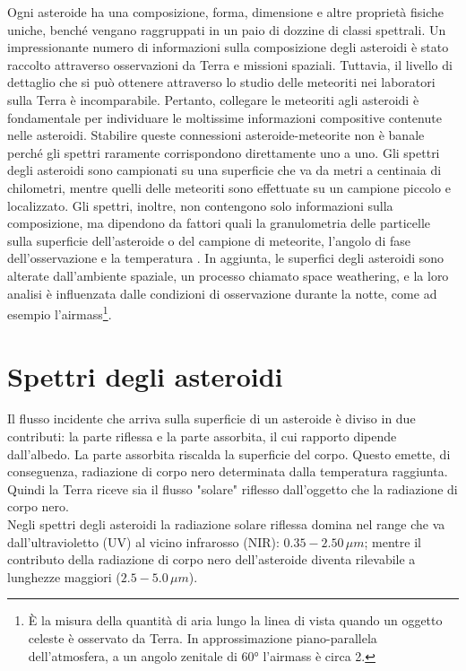 \documentclass[a4paper,11pt,openright]{book}
\begin{document}
Ogni asteroide ha una composizione, forma, dimensione e altre proprietà fisiche uniche, benché vengano raggruppati in un paio di dozzine di classi spettrali. Un impressionante numero di informazioni sulla composizione degli asteroidi è stato raccolto attraverso osservazioni da Terra e missioni spaziali. Tuttavia, il livello di dettaglio che si può ottenere attraverso lo studio delle meteoriti nei laboratori sulla Terra è incomparabile. Pertanto, collegare le meteoriti agli asteroidi è fondamentale per individuare le moltissime informazioni compositive contenute nelle asteroidi. Stabilire queste connessioni asteroide-meteorite non è banale perché gli spettri raramente corrispondono direttamente uno a uno. Gli spettri degli asteroidi sono campionati su una superficie che va da metri a centinaia di chilometri, mentre quelli delle meteoriti sono effettuate su un campione piccolo e localizzato. Gli spettri, inoltre, non contengono solo informazioni sulla composizione, ma dipendono da fattori quali la granulometria delle particelle sulla superficie dell'asteroide o del campione di meteorite, l'angolo di fase dell'osservazione e la temperatura \citep{demeo_connecting_2022}. In aggiunta, le superfici degli asteroidi sono alterate dall'ambiente spaziale, un processo chiamato space weathering, e la loro analisi è influenzata dalle condizioni di osservazione durante la notte, come ad esempio l'airmass\footnote{È la misura della quantità di aria lungo la linea di vista quando un oggetto celeste è osservato da Terra. In approssimazione piano-parallela dell'atmosfera, a un angolo zenitale di 60° l'airmass è circa 2.}.



\section{Spettri degli asteroidi}
Il flusso incidente che arriva sulla superficie di un asteroide è diviso in due contributi: la parte riflessa e la parte assorbita, il cui rapporto dipende dall'albedo. La parte assorbita riscalda la superficie del corpo. Questo emette, di conseguenza, radiazione di corpo nero determinata dalla temperatura raggiunta. Quindi la Terra riceve sia il flusso "solare" riflesso dall'oggetto che la radiazione di corpo nero.\\
Negli spettri degli asteroidi la radiazione solare riflessa domina nel range che va dall'ultravioletto (UV) al vicino infrarosso (NIR): $0.35-2.50\,\mu m$; mentre il contributo della radiazione di corpo nero dell'asteroide diventa rilevabile a lunghezze maggiori ($2.5-5.0\,\mu m$).
\end{document}
